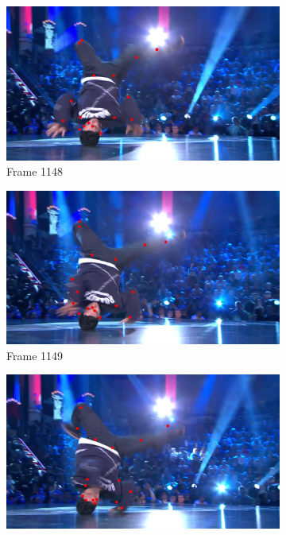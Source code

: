 \documentclass[./main.tex]{subfiles}
\begin{document}
\begin{figure}[htbp]
    \centering
    \begin{subfigure}{0.5\textwidth}
        \centering
        \includegraphics[width=\textwidth]{entities/BRACE_1148.png}
        \caption{Frame 1148}
    \end{subfigure}
    \begin{subfigure}{0.5\textwidth}
        \centering
        \includegraphics[width=\textwidth]{entities/BRACE_1149.png}
        \caption{Frame 1149}
    \end{subfigure}
    \begin{subfigure}{0.5\textwidth}
        \centering
        \includegraphics[width=\textwidth]{entities/BRACE_1150.png}

\end{subfigure}
\end{figure}
\end{document}
